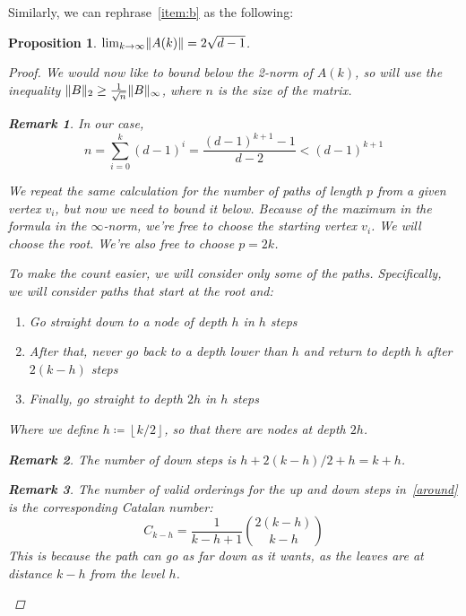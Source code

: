 \documentclass{amsart}
\theoremstyle{plain}
\newtheorem*{proposition}{\textbf{Proposition}}
\theoremstyle{definition}
\newtheorem*{rk}{\textbf{Remark}}
\DeclarePairedDelimiter{\norm}{\lVert}{\rVert}
\begin{document}
    Similarly, we can rephrase~\ref{item:b} as the following:
    \begin{proposition}
        $\lim_{k \to \infty} \norm{A(k)} = 2 \sqrt{d - 1}$.

        \begin{proof}
            We would now like to bound \emph{below} the 2-norm of $A(k)$, so will use the inequality
            $\norm{B}_2 \geq \frac{1}{\sqrt{n}} \norm{B}_\infty$, where $n$ is the size of the matrix.
            \begin{rk}
                In our case,
                \begin{equation*}
                    n = \sum_{i=0}^{k} (d-1)^i = \frac{(d-1)^{k+1} - 1}{d-2} < (d-1)^{k+1}
                \end{equation*}
            \end{rk}

            We repeat the same calculation for the number of paths of length $p$ from a given vertex $v_i$,
            but now we need to bound it below.
            Because of the maximum in the formula in the $\infty$-norm,
            we're free to choose the starting vertex $v_i$.
            We will choose the root.
            We're also free to choose $p = 2k$.

            To make the count easier, we will consider only some of the paths.
            Specifically, we will consider paths that start at the root and:

            \begin{enumerate}
                \item Go straight \emph{down} to a node of depth $h$ in $h$ steps \label{item:down1}
                \item After that, never go back to a depth lower than $h$
                and return to depth $h$ after $2(k-h)$ steps\label{around}
                \item Finally, go straight to depth $2h$ in $h$ steps \label{item:down2}
            \end{enumerate}

            Where we define $h \coloneqq \left \lfloor k/2 \right \rfloor$, so that there are nodes at depth $2h$.

            \begin{rk}
                The number of \emph{down} steps is $h + 2(k-h)/2 + h = k + h$.
            \end{rk}

            \begin{rk}
                The number of valid orderings for the \emph{up} and \emph{down} steps in~\eqref{around} is
                the corresponding \emph{Catalan number}:
                \begin{equation*}
                    C_{k-h} = \frac{1}{k-h+1} \binom{2(k-h)}{k-h}
                \end{equation*}
                This is because the path can go as far down as it wants, as the leaves are at distance $k-h$
                from the level $h$.
            \end{rk}


\end{proof}
\end{proposition}
\end{document}
